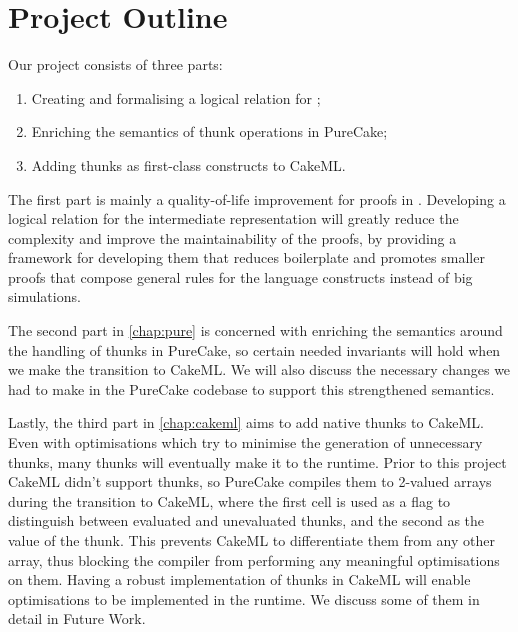 \section{Project Outline}

Our project consists of three parts:
\begin{enumerate}
  \item Creating and formalising a logical relation for \ThunkLang{};
  \item Enriching the semantics of thunk operations in PureCake;
  \item Adding thunks as first-class constructs to CakeML.
\end{enumerate}

The first part is mainly a quality-of-life improvement for proofs in
\ThunkLang{}. Developing a logical relation for the intermediate representation
will greatly reduce the complexity and improve the maintainability of the
proofs, by providing a framework for developing them that reduces boilerplate
and promotes smaller proofs that compose general rules for the language
constructs instead of big simulations.

The second part in \autoref{chap:pure} is concerned with enriching the semantics
around the handling of thunks in PureCake, so certain needed invariants will
hold when we make the transition to CakeML. We will also discuss the necessary
changes we had to make in the PureCake codebase to support this strengthened
semantics.

Lastly, the third part in \autoref{chap:cakeml} aims to add native thunks to
CakeML. Even with optimisations  which try to minimise the generation of
unnecessary thunks, many thunks will eventually make it to the runtime. Prior to
this project CakeML didn't support thunks, so PureCake compiles them to 2-valued
arrays during the transition to CakeML, where the first cell is used as a flag
to distinguish between evaluated and unevaluated thunks, and the second as the
value of the thunk. This prevents CakeML to differentiate them from any other
array, thus blocking the compiler from performing any meaningful optimisations
on them. Having a robust implementation of thunks in CakeML will enable
optimisations to be implemented in the runtime. We discuss some of them in
detail in Future Work.

